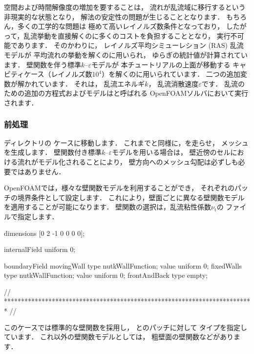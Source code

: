 空間および時間解像度の増加を要することは，
流れが乱流域に移行するという非現実的な状態となり，
解法の安定性の問題が生じることとなります．
もちろん，多くの工学的な問題は
極めて高いレイノルズ数条件となっており，
したがって，乱流挙動を直接解くのに多くのコストを負担することとなり，
実行不可能であります．
そのかわりに，
%
レイノルズ平均シミューレション (RAS) 乱流モデルが
平均流れの挙動を解くのに用いられ，
ゆらぎの統計値が計算されています．
壁関数を伴う標準$k$--$\varepsilon$モデルが
本チュートリアルの上面が移動する
キャビティケース（レイノルズ数$10^{4}$）を解くのに用いられています．
二つの追加変数が解かれています．
それは，
%
乱流エネルギ$k$，
%
乱流消散速度$\varepsilon$です．
乱流のための追加の方程式およびモデルはと呼ばれる
OpenFOAMソルバにおいて実行されます．

\subsubsection{前処理}
\label{sssec:2.1.8.1}
ディレクトリの
ケースに移動します．
これまでと同様に，を走らせ，
メッシュを生成します．
壁関数付き標準$k$--$\varepsilon$モデルを用いる場合は，
壁近傍のセルにおける流れがモデル化されることにより，
壁方向へのメッシュ勾配は必ずしも必要ではありません．

OpenFOAMでは，様々な壁関数モデルを利用することができ，
それぞれのパッチの境界条件として設定します．
これにより，壁面ごとに異なる壁関数モデルを適用することが可能になります．
壁関数の選択は，乱流粘性係数$\nu_{\mathrm{t}}$の
ファイルで指定します．
\begin{OFverbatim}[file, linenum=17]

dimensions      [0 2 -1 0 0 0 0];

internalField   uniform 0;

boundaryField
{
    movingWall
    {
        type            nutkWallFunction;
        value           uniform 0;
    }
    fixedWalls
    {
        type            nutkWallFunction;
        value           uniform 0;
    }
    frontAndBack
    {
        type            empty;
    }
}


// ************************************************************************* //
\end{OFverbatim}
このケースでは標準的な壁関数を採用し，
とのパッチに対して
タイプを指定しています．
これ以外の壁関数モデルとしては，
粗壁面の壁関数などがあります．


